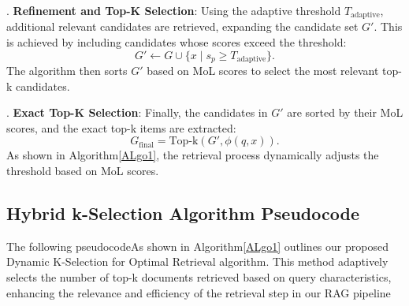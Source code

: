 . \textbf{Refinement and Top-K Selection}:  
Using the adaptive threshold \(T_{\text{adaptive}}\), additional relevant candidates are retrieved, expanding the candidate set \(G'\). This is achieved by including candidates whose scores exceed the threshold:
\begin{equation}
	G' \leftarrow G \cup \{x \mid s_p \geq T_{\text{adaptive}}\}.
\end{equation}
The algorithm then sorts \(G'\) based on MoL scores to select the most relevant top-k candidates.

. \textbf{Exact Top-K Selection}:  
Finally, the candidates in \(G'\) are sorted by their MoL scores, and the exact top-k items are extracted:
\begin{equation}
	G_{\text{final}} = \text{Top-k}(G', \phi(q, x)).
\end{equation}
As shown in Algorithm\ref{ALgo1}, the retrieval process dynamically adjusts the threshold based on MoL scores.



\subsection{Hybrid k-Selection Algorithm Pseudocode}
The following pseudocodeAs shown in Algorithm\ref{ALgo1} outlines our proposed Dynamic K-Selection for Optimal Retrieval algorithm. This method adaptively selects the number of top-k documents retrieved based on query characteristics, enhancing the relevance and efficiency of the retrieval step in our RAG pipeline

